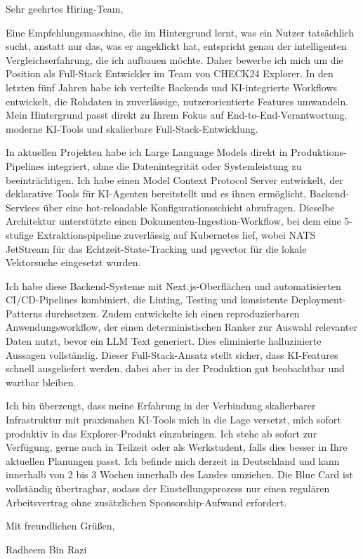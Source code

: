 \documentclass[11pt,a4paper]{coverletter}
\begin{document}

\opening{Sehr geehrtes Hiring-Team,}

Eine Empfehlungsmaschine, die im Hintergrund lernt, was ein Nutzer tatsächlich sucht, anstatt nur das, was er angeklickt hat, entspricht genau der intelligenten Vergleichserfahrung, die ich aufbauen möchte. Daher bewerbe ich mich um die Position als Full-Stack Entwickler im Team von CHECK24 Explorer. In den letzten fünf Jahren habe ich verteilte Backends und KI-integrierte Workflows entwickelt, die Rohdaten in zuverlässige, nutzerorientierte Features umwandeln. Mein Hintergrund passt direkt zu Ihrem Fokus auf End-to-End-Verantwortung, moderne KI-Tools und skalierbare Full-Stack-Entwicklung.

In aktuellen Projekten habe ich Large Language Models direkt in Produktions-Pipelines integriert, ohne die Datenintegrität oder Systemleistung zu beeinträchtigen. Ich habe einen Model Context Protocol Server entwickelt, der deklarative Tools für KI-Agenten bereitstellt und es ihnen ermöglicht, Backend-Services über eine hot-reloadable Konfigurationsschicht abzufragen. Dieselbe Architektur unterstützte einen Dokumenten-Ingestion-Workflow, bei dem eine 5-stufige Extraktionspipeline zuverlässig auf Kubernetes lief, wobei NATS JetStream für das Echtzeit-State-Tracking und pgvector für die lokale Vektorsuche eingesetzt wurden.

Ich habe diese Backend-Systeme mit Next.js-Oberflächen und automatisierten CI/CD-Pipelines kombiniert, die Linting, Testing und konsistente Deployment-Patterns durchsetzen. Zudem entwickelte ich einen reproduzierbaren Anwendungsworkflow, der einen deterministischen Ranker zur Auswahl relevanter Daten nutzt, bevor ein LLM Text generiert. Dies eliminierte halluzinierte Aussagen vollständig. Dieser Full-Stack-Ansatz stellt sicher, dass KI-Features schnell ausgeliefert werden, dabei aber in der Produktion gut beobachtbar und wartbar bleiben.

Ich bin überzeugt, dass meine Erfahrung in der Verbindung skalierbarer Infrastruktur mit praxisnahen KI-Tools mich in die Lage versetzt, mich sofort produktiv in das Explorer-Produkt einzubringen. Ich stehe ab sofort zur Verfügung, gerne auch in Teilzeit oder als Werkstudent, falls dies besser in Ihre aktuellen Planungen passt. Ich befinde mich derzeit in Deutschland und kann innerhalb von 2 bis 3 Wochen innerhalb des Landes umziehen. Die Blue Card ist vollständig übertragbar, sodass der Einstellungsprozess nur einen regulären Arbeitsvertrag ohne zusätzlichen Sponsorship-Aufwand erfordert.

\closing{Mit freundlichen Grüßen,}{Radheem Bin Razi}
\end{document}
